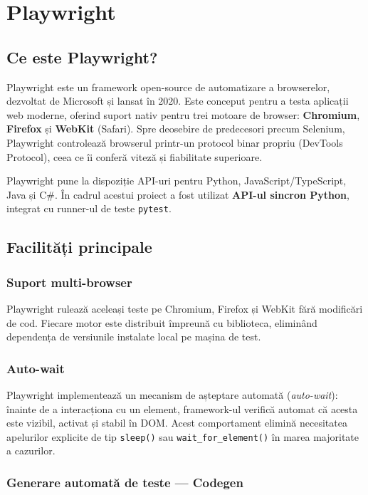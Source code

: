 \chapter{Playwright}

\section{Ce este Playwright?}

Playwright este un framework open-source de automatizare a browserelor, dezvoltat de Microsoft
și lansat în 2020. Este conceput pentru a testa aplicații web moderne, oferind suport nativ
pentru trei motoare de browser: \textbf{Chromium}, \textbf{Firefox} și \textbf{WebKit} (Safari).
Spre deosebire de predecesori precum Selenium, Playwright controlează browserul printr-un
protocol binar propriu (DevTools Protocol), ceea ce îi conferă viteză și fiabilitate superioare.

Playwright pune la dispoziție API-uri pentru Python, JavaScript/TypeScript, Java și C\#.
În cadrul acestui proiect a fost utilizat \textbf{API-ul sincron Python}, integrat cu
runner-ul de teste \texttt{pytest}.

\section{Facilități principale}

\subsection{Suport multi-browser}

Playwright rulează aceleași teste pe Chromium, Firefox și WebKit fără modificări de cod.
Fiecare motor este distribuit împreună cu biblioteca, eliminând dependența de versiunile
instalate local pe mașina de test.

\subsection{Auto-wait}

Playwright implementează un mecanism de așteptare automată (\textit{auto-wait}): înainte de
a interacționa cu un element, framework-ul verifică automat că acesta este vizibil, activat
și stabil în DOM. Acest comportament elimină necesitatea apelurilor explicite de tip
\texttt{sleep()} sau \texttt{wait\_for\_element()} în marea majoritate a cazurilor.

\subsection{Generare automată de teste --- Codegen}

